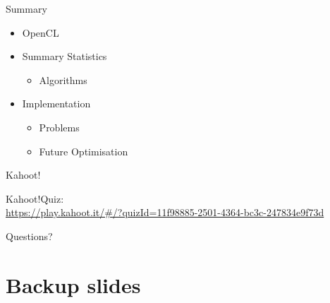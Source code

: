 \documentclass[10pt,aspectratio=169]{beamer} %
\begin{document}
\begin{frame}{Summary}

\begin{itemize}
\item OpenCL
\item Summary Statistics
\begin{itemize}
\item Algorithms
\end{itemize}
\item Implementation
\begin{itemize}
\item Problems
\item Future Optimisation
\end{itemize}
\end{itemize}


\end{frame}

\begin{frame}[fragile]{Kahoot!\texttrademark}

\alert{Kahoot!\texttrademark  Quiz:}\\

\small
\url{https://play.kahoot.it/#/?quizId=11f98885-2501-4364-bc3c-247834e9f73d}
\normalsize

\end{frame}

\begin{frame}[standout]
  Questions?
\end{frame}

\appendix

\section{Backup slides}
\end{document}
